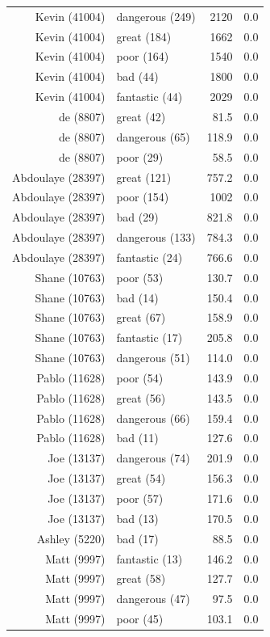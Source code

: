 \documentclass[10pt, a4paper]{UUThesisTemplate}
\begin{document}
\begin{table}
\begin{minipage}[t]{8cm}
\begin{tabular}{r l r l}
Kevin (41004) & dangerous (249) & 2120 & $0.0$\\
Kevin (41004) & great (184) & 1662 & $0.0$\\
Kevin (41004) & poor (164) & 1540 & $0.0$\\
Kevin (41004) & bad (44) & 1800 & $0.0$\\
Kevin (41004) & fantastic (44) & 2029 & $0.0$\\
de (8807) & great (42) & 81.5 & $0.0$\\
de (8807) & dangerous (65) & 118.9 & $0.0$\\
de (8807) & poor (29) & 58.5 & $0.0$\\
Abdoulaye (28397) & great (121) & 757.2 & $0.0$\\
Abdoulaye (28397) & poor (154) & 1002 & $0.0$\\
Abdoulaye (28397) & bad (29) & 821.8 & $0.0$\\
Abdoulaye (28397) & dangerous (133) & 784.3 & $0.0$\\
Abdoulaye (28397) & fantastic (24) & 766.6 & $0.0$\\
Shane (10763) & poor (53) & 130.7 & $0.0$\\
Shane (10763) & bad (14) & 150.4 & $0.0$\\
Shane (10763) & great (67) & 158.9 & $0.0$\\
Shane (10763) & fantastic (17) & 205.8 & $0.0$\\
Shane (10763) & dangerous (51) & 114.0 & $0.0$\\
Pablo (11628) & poor (54) & 143.9 & $0.0$\\
Pablo (11628) & great (56) & 143.5 & $0.0$\\
Pablo (11628) & dangerous (66) & 159.4 & $0.0$\\
Pablo (11628) & bad (11) & 127.6 & $0.0$\\
Joe (13137) & dangerous (74) & 201.9 & $0.0$\\
Joe (13137) & great (54) & 156.3 & $0.0$\\
Joe (13137) & poor (57) & 171.6 & $0.0$\\
Joe (13137) & bad (13) & 170.5 & $0.0$\\
Ashley (5220) & bad (17) & 88.5 & $0.0$\\
Matt (9997) & fantastic (13) & 146.2 & $0.0$\\
Matt (9997) & great (58) & 127.7 & $0.0$\\
Matt (9997) & dangerous (47) & 97.5 & $0.0$\\
Matt (9997) & poor (45) & 103.1 & $0.0$\\

\end{tabular}
\end{minipage}
\end{table}
\end{document}
